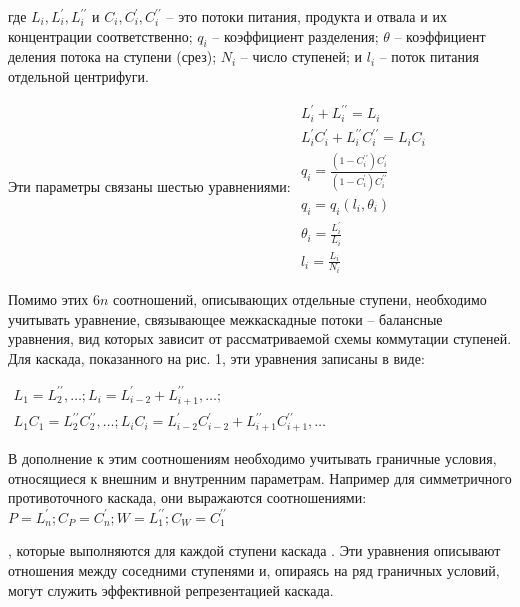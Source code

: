 где $L_{i}, L_{i}^{\prime}, L_{i}^{\prime \prime}$ и $C_{i}, C_{i}^{\prime}, C_{i}^{\prime \prime}$ -- 
это потоки питания, продукта и отвала и их концентрации соответственно; $q_{i}$ -- коэффициент разделения; $\theta$ -- коэффициент деления потока на ступени (срез); $N_{i}$ -- число ступеней; и $l_{i}$ -- поток питания отдельной центрифуги.

Эти параметры связаны шестью уравнениями:
$\begin{array}{c}
  {L_{i}^{\prime}+L_{i}^{\prime \prime}=L_{i}} \\
  {L_{i}^{\prime} C_{i}^{\prime}+L_{i}^{\prime \prime} C_{i}^{\prime \prime}=L_{i} C_{i}} \\
  {q_{i}=\frac{(1-C_{i}^{\prime \prime}) C_{i}^{\prime}}{(1-C_{i}^{\prime}) C_{i}^{\prime \prime}}} \\
  {q_{i}=q_{i}\left(l_{i}, \theta_{i}\right)} \\
  {\theta_{i}=\frac{L_{i}^{\prime}}{L_{i}}} \\
  {l_{i}=\frac{L_{i}}{N_{i}}}
\end{array}$


Помимо этих 6$n$ соотношений, описывающих отдельные ступени, необходимо учитывать уравнение, связывающее межкаскадные потоки -- балансные уравнения, вид которых зависит от рассматриваемой схемы коммутации ступеней. Для каскада, показанного на рис. 1, эти уравнения записаны в виде:

$\begin{array}{c}
  {L_{1}=L_{2}^{\prime \prime}, \ldots ; L_{i}=L_{i-2}^{\prime}+L_{i+1}^{\prime \prime}, \ldots ;} \\
  {L_{1} C_{1}=L_{2}^{\prime \prime} C_{2}^{\prime \prime}, \ldots ; L_{i} C_{i}=L_{i-2}^{\prime} C_{i-2}^{\prime}+L_{i+1}^{\prime \prime} C_{i+1}^{\prime \prime}, \ldots}
\end{array}$

В дополнение к этим соотношениям необходимо учитывать граничные условия, относящиеся к внешним и внутренним параметрам. Например для симметричного противоточного каскада, они выражаются соотношениями: 
$P=L_{n}^{\prime} ; C_{P}=C_{n}^{\prime} ; W=L_{1}^{\prime \prime} ; C_{W}=C_{1}^{\prime \prime}$

, которые выполняются для каждой ступени каскада \cite{palkinDeterminationOptimalParameters2012}. Эти уравнения описывают отношения между соседними ступенями и, опираясь на ряд граничных условий, могут служить эффективной репрезентацией каскада.

